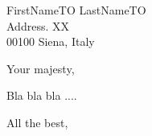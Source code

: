 \documentclass[brief]{scrlttr2}
\begin{document}
\begin{letter}
{FirstNameTO LastNameTO\\
Address. XX\\
00100 Siena, Italy
}

\opening{Your majesty,}

Bla bla bla ....

\closing{All the best,}

\end{letter}
\end{document}

